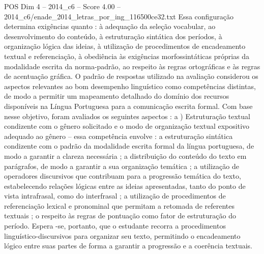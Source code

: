 \begin{textsample}{POS Dim 4 – 2014\_c6 – Score 4.00 – 2014\_c6/enade\_2014\_letras\_por\_ing\_116500ce32.txt}
Essa configuração determina exigências quanto : à adequação da seleção vocabular, ao desenvolvimento do conteúdo, à estruturação sintática dos períodos, à organização lógica das ideias, à utilização de procedimentos de encadeamento textual e referenciação, à obediência às exigências morfossintáticas próprias da modalidade escrita da norma-padrão, ao respeito às regras ortográficas e às regras de acentuação gráfica.
O padrão de respostas utilizado na avaliação considerou os aspectos relevantes ao bom desempenho linguístico como competências distintas, de modo a permitir um mapeamento detalhado do domínio dos recursos disponíveis na Língua Portuguesa para a comunicação escrita formal.
Com base nesse objetivo, foram avaliados os seguintes aspectos : a ) Estruturação textual condizente com o gênero solicitado e o modo de organização textual expositivo adequado ao gênero – essa competência envolve : a estruturação sintática condizente com o padrão da modalidade escrita formal da língua portuguesa, de modo a garantir a clareza necessária ; a distribuição do conteúdo do texto em parágrafos, de modo a garantir a sua organização temática ; a utilização de operadores discursivos que contribuam para a progressão temática do texto, estabelecendo relações lógicas entre as ideias apresentadas, tanto do ponto de vista intrafrasal, como do interfrasal ; a utilização de procedimentos de referenciação lexical e pronominal que permitam a retomada de referentes textuais ; o respeito às regras de pontuação como fator de estruturação do período.
Espera -se, portanto, que o estudante recorra a procedimentos linguístico-discursivos para organizar seu texto, permitindo o encadeamento lógico entre suas partes de forma a garantir a progressão e a coerência textuais.

\end{textsample}

